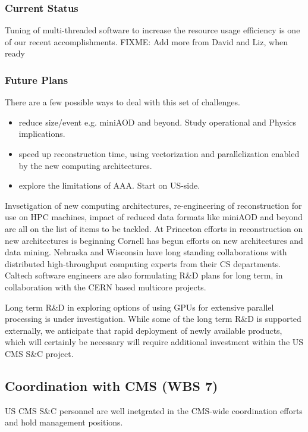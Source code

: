 \documentclass[11pt,a4paper]{article}
\begin{document}
\subsubsection{Current Status}

Tuning of multi-threaded software to increase the resource
usage efficiency is one of our recent accomplishments.  
{FIXME: Add more from David and Liz, when ready}

\subsubsection{Future Plans}

There are a few possible ways to deal with this set of challenges. 
\begin{itemize}
\item reduce size/event e.g. miniAOD and beyond. Study operational and Physics implications.
\item speed up reconstruction time, using vectorization and parallelization enabled by the new computing architectures. 
\item explore the limitations of AAA. Start on US-side.  
\end{itemize}

Invsetigation of new computing architectures, re-engineering of
reconstruction for use on HPC machines, impact of reduced data formats
like miniAOD and beyond are all on the list of items to be tackled.
At Princeton efforts in reconstruction on new architectures is
beginning Cornell has begun efforts on new architectures and data
mining.  Nebraska and Wisconsin have long standing collaborations with
distributed high-throughput computing experts from their CS
departments.  Caltech software engineers are also formulating R\&D
plans for long term, in collaboration with the CERN based multicore
projects.

Long term R\&D in exploring options of using GPUs for extensive
parallel processing is under investigation.  While some of the long
term R\&D is supported externally, we anticipate that rapid deployment
of newly available products, which will certainly be necessary will
require additional investment within the US CMS S\&C project.


\subsection{Coordination with CMS (WBS 7)}

US CMS S\&C personnel are well inetgrated in the CMS-wide coordination
efforts and hold management positions.  
\end{document}
